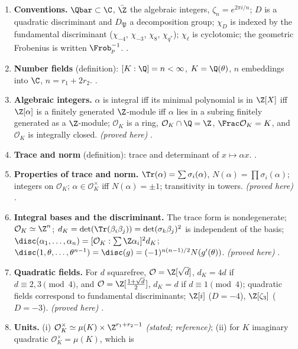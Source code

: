 \begin{enumerate}[label=\textbf{\thechapter.\arabic*}]
\item \textbf{Conventions.} $\Qbar\subset\C$, $\bar\Z$ the algebraic integers, $\zeta_n=e^{2\pi i/n}$; $D$ is a quadratic discriminant and $D_{\mathfrak P}$ a decomposition
group; $\chi_D$ is indexed by the fundamental discriminant ($\chi_{-4}$, $\chi_{-3}$, $\chi_8$, $\chi_{q^*}$); $\chi_\ell$ is cyclotomic; the geometric Frobenius is written
$\Frob_p^{-1}$. .
\item \textbf{Number fields} (definition): $[K:\Q]=n<\infty$, $K=\Q(\theta)$, $n$ embeddings into $\C$, $n=r_1+2r_2$. .
\item \textbf{Algebraic integers.} $\alpha$ is integral iff its minimal polynomial is in $\Z[X]$ iff $\Z[\alpha]$ is a finitely generated $\Z$-module iff $\alpha$ lies in
a subring finitely generated as a $\Z$-module; $\mathcal O_K$ is a ring, $\mathcal O_K\cap\Q=\Z$, $\Frac\mathcal O_K=K$, and $\mathcal O_K$ is integrally closed.
\emph{(proved here)} .
\item \textbf{Trace and norm} (definition): trace and determinant of $x\mapsto\alpha x$. .
\item \textbf{Properties of trace and norm.} $\Tr(\alpha)=\sum\sigma_i(\alpha)$, $N(\alpha)=\prod\sigma_i(\alpha)$; integers on $\mathcal O_K$; $\alpha\in\mathcal O_K^\times$ iff
$N(\alpha)=\pm1$; transitivity in towers. \emph{(proved here)} .
\item \textbf{Integral bases and the discriminant.} The trace form is nondegenerate; $\mathcal O_K\simeq\Z^n$; $d_K=\det(\Tr(\beta_i\beta_j))=\det(\sigma_k\beta_j)^2$ is
independent of the basis; $\disc(\alpha_1,\dots,\alpha_n)=[\mathcal O_K:\sum\Z\alpha_i]^2d_K$; $\disc(1,\theta,\dots,\theta^{n-1})=\disc(g)=(-1)^{n(n-1)/2}N(g'(\theta))$.
\emph{(proved here)} .
\item \textbf{Quadratic fields.} For $d$ squarefree, $\mathcal O=\Z[\sqrt d]$, $d_K=4d$ if $d\equiv2,3\pmod4$, and $\mathcal O=\Z[\frac{1+\sqrt d}2]$, $d_K=d$ if
$d\equiv1\pmod4$; quadratic fields correspond to fundamental discriminants; $\Z[i]$ ($D=-4$), $\Z[\zeta_3]$ ($D=-3$). \emph{(proved here)}
.
\item \textbf{Units.} (i) $\mathcal O_K^\times\simeq\mu(K)\times\Z^{r_1+r_2-1}$ \emph{(stated; reference)}; (ii) for $K$ imaginary quadratic $\mathcal O_K^\times=\mu(K)$, which is

\end{enumerate}
